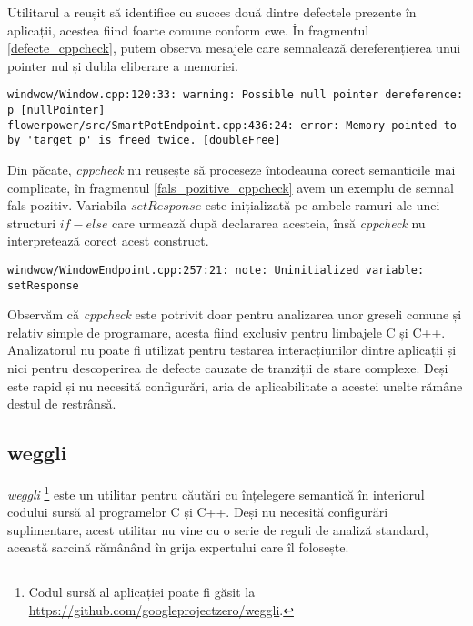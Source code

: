 Utilitarul a reușit să identifice cu succes două dintre defectele prezente în aplicații, acestea fiind foarte comune conform \acrfull{cwe}. În fragmentul \ref{defecte_cppcheck}, putem observa mesajele care semnalează dereferențierea unui pointer nul și dubla eliberare a memoriei. 

\begin{lstlisting}[caption={Cele două defecte detectate de \textit{cppcheck}}, label={defecte_cppcheck}]
windwow/Window.cpp:120:33: warning: Possible null pointer dereference: p [nullPointer]
flowerpower/src/SmartPotEndpoint.cpp:436:24: error: Memory pointed to by 'target_p' is freed twice. [doubleFree]
\end{lstlisting}

Din păcate, \textit{cppcheck} nu reușește să proceseze întodeauna corect semanticile mai complicate, în fragmentul \ref{fals_pozitive_cppcheck} avem un exemplu de semnal fals pozitiv. Variabila $setResponse$ este inițializată pe ambele ramuri ale unei structuri $if - else$ care urmează după declararea acesteia, însă \textit{cppcheck} nu interpretează corect acest construct.

\begin{lstlisting}[caption={Exemplu de fals pozitiv detectat de \textit{cppcheck}}, label={fals_pozitive_cppcheck}]
windwow/WindowEndpoint.cpp:257:21: note: Uninitialized variable: setResponse
\end{lstlisting}

Observăm că \textit{cppcheck} este potrivit doar pentru analizarea unor greșeli comune și relativ simple de programare, acesta fiind exclusiv pentru limbajele C și C++. Analizatorul nu poate fi utilizat pentru testarea interacțiunilor dintre aplicații și nici pentru descoperirea de defecte cauzate de tranziții de stare complexe. Deși este rapid și nu necesită configurări, aria de aplicabilitate a acestei unelte rămâne destul de restrânsă.

\subsection*{weggli}

\textit{weggli} \footnote{Codul sursă al aplicației poate fi găsit la \url{https://github.com/googleprojectzero/weggli}.} este un utilitar pentru căutări cu înțelegere semantică în interiorul codului sursă al programelor C și C++. Deși nu necesită configurări suplimentare, acest utilitar nu vine cu o serie de reguli de analiză standard, această sarcină rămânând în grija expertului care îl folosește.


